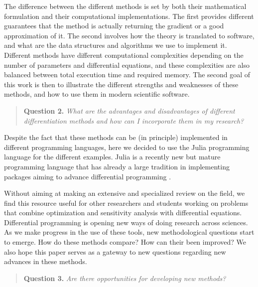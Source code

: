 The difference between the different methods is set by both their mathematical formulation and their computational implementations. 
The first provides different guarantees that the method is actually returning the gradient or a good approximation of it. 
The second involves how the theory is translated to software, and what are the data structures and algorithms we use to implement it. 
Different methods have different computational complexities depending on the number of parameters and differential equations, and these complexities are also balanced between total execution time and required memory. 
The second goal of this work is then to illustrate the different strengths and weaknesses of these methods, and how to use them in modern scientific software. 
\begin{quote}
    \textbf{Question 2. }
    \textit{What are the advantages and disadvantages of different differentiation methods and how can I incorporate them in my research?}
\end{quote}
Despite the fact that these methods can be (in principle) implemented in different programming languages, here we decided to use the Julia programming language for the different examples. 
Julia is a recently new but mature programming language that has already a large tradition in implementing packages aiming to advance differential programming \cite{Julialang_2017}. 

Without aiming at making an extensive and specialized review on the field, we find this resource useful for other researchers and students working on problems that combine optimization and sensitivity analysis with differential equations.
Differential programming is opening new ways of doing research across sciences. 
As we make progress in the use of these tools, new methodological questions start to emerge. 
How do these methods compare? How can their been improved? 
We also hope this paper serves as a gateway to new questions regarding new advances in these methods. 
\begin{quote}
    \textbf{Question 3. }
    \textit{Are there opportunities for developing new methods?}
\end{quote}


